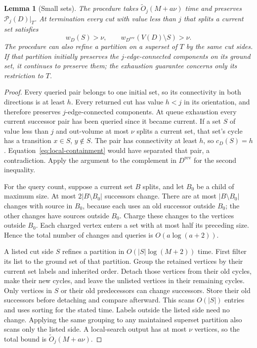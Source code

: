 \documentclass[11pt]{article}
\newtheorem{lemma}[theorem]{Lemma}
\theoremstyle{definition}
\theoremstyle{remark}
\newcommand{\rev}[1]{#1^{\mathrm{rev}}}
\newcommand{\PP}{\mathcal P}
\newcommand{\OO}{\widetilde O}
\begin{document}
\begin{lemma}[Small sets]
\label{lem:small}
The procedure takes \(\OO_j(M+a\nu)\) time and preserves \(\PP_j(D)|_T\). At termination every cut with value less than \(j\) that splits a current set satisfies
\begin{equation}
 w_D(S)>\nu,\qquad w_{\rev D}(V(D)\setminus S)>\nu.
 \label{eq:small-exhausted}
\end{equation}
The procedure can also refine a partition on a superset of \(T\) by the same cut sides. If that partition initially preserves the \(j\)-edge-connected components on its ground set, it continues to preserve them; the exhaustion guarantee concerns only its restriction to \(T\).
\end{lemma}
\begin{proof}
Every queried pair belongs to one initial set, so its connectivity in both directions is at least \(h\). Every returned cut has value \(h<j\) in its orientation, and therefore preserves \(j\)-edge-connected components. At queue exhaustion every current successor pair has been queried since it became current. If a set \(S\) of value less than \(j\) and out-volume at most \(\nu\) splits a current set, that set's cycle has a transition \(x\in S\), \(y\notin S\). The pair has connectivity at least \(h\), so \(c_D(S)=h\). Equation~\eqref{eq:local-containment} would have separated that pair, a contradiction. Apply the argument to the complement in \(\rev D\) for the second inequality.

For the query count, suppose a current set \(B\) splits, and let \(B_0\) be a child of maximum size. At most \(2|B\setminus B_0|\) successors change. There are at most \(|B\setminus B_0|\) changes with source in \(B_0\), because each uses an old successor outside \(B_0\); the other changes have sources outside \(B_0\). Charge these changes to the vertices outside \(B_0\). Each charged vertex enters a set with at most half its preceding size. Hence the total number of changes and queries is \(O(a\log(a+2))\).

A listed cut side \(S\) refines a partition in \(O(|S|\log(M+2))\) time. First filter its list to the ground set of that partition. Group the retained vertices by their current set labels and inherited order. Detach those vertices from their old cycles, make their new cycles, and leave the unlisted vertices in their remaining cycles. Only vertices in \(S\) or their old predecessors can change successors. Store their old successors before detaching and compare afterward. This scans \(O(|S|)\) entries and uses sorting for the stated time. Labels outside the listed side need no change. Applying the same grouping to any maintained superset partition also scans only the listed side. A local-search output has at most \(\nu\) vertices, so the total bound is \(\OO_j(M+a\nu)\).
\end{proof}
\end{document}
